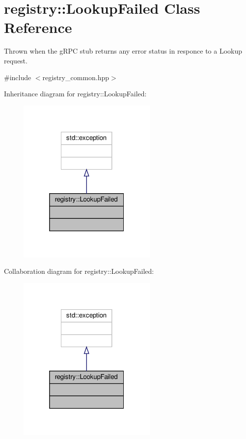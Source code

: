 \hypertarget{classregistry_1_1LookupFailed}{}\section{registry\+:\+:Lookup\+Failed Class Reference}
\label{classregistry_1_1LookupFailed}


Thrown when the g\+R\+PC stub returns any error status in responce to a Lookup request.  




{\ttfamily \#include $<$registry\+\_\+common.\+hpp$>$}



Inheritance diagram for registry\+:\+:Lookup\+Failed\+:
\nopagebreak
\begin{figure}[H]
\begin{center}
\leavevmode
\includegraphics[width=193pt]{classregistry_1_1LookupFailed__inherit__graph}
\end{center}
\end{figure}


Collaboration diagram for registry\+:\+:Lookup\+Failed\+:
\nopagebreak
\begin{figure}[H]
\begin{center}
\leavevmode
\includegraphics[width=193pt]{classregistry_1_1LookupFailed__coll__graph}
\end{center}
\end{figure}


